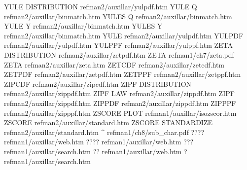 YULE DISTRIBUTION                       refman2/auxillar/yulpdf.htm
YULE Q                                  refman2/auxillar/binmatch.htm
YULES Q                                 refman2/auxillar/binmatch.htm
YULE Y                                  refman2/auxillar/binmatch.htm
YULES Y                                 refman2/auxillar/binmatch.htm
YULE                                    refman2/auxillar/yulpdf.htm
YULPDF                                  refman2/auxillar/yulpdf.htm
YULPPF                                  refman2/auxillar/yulppf.htm
ZETA DISTRIBUTION                       refman2/auxillar/zetpdf.htm
ZETA                                    refman1/ch7/zeta.pdf
ZETA                                    refman2/auxillar/zeta.htm
ZETCDF                                  refman2/auxillar/zetcdf.htm
ZETPDF                                  refman2/auxillar/zetpdf.htm
ZETPPF                                  refman2/auxillar/zetppf.htm
ZIPCDF                                  refman2/auxillar/zipcdf.htm
ZIPF DISTRIBUTION                       refman2/auxillar/zippdf.htm
ZIPF LAW                                refman2/auxillar/zippdf.htm
ZIPF                                    refman2/auxillar/zippdf.htm
ZIPPDF                                  refman2/auxillar/zippdf.htm
ZIPPPF                                  refman2/auxillar/zipppf.htm
ZSCORE PLOT                             refman1/auxillar/isozscor.htm
ZSCORE                                  refman2/auxillar/standard.htm
ZSCORE STANDARDIZE                      refman2/auxillar/standard.htm
^                                       refman1/ch8/sub_char.pdf
????                                    refman1/auxillar/web.htm
????                                    refman1/auxillar/web.htm
???                                     refman1/auxillar/search.htm
??                                      refman1/auxillar/web.htm
?                                       refman1/auxillar/search.htm
